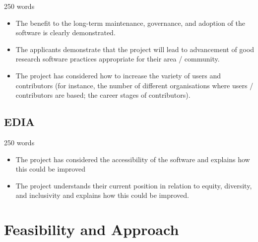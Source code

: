 \documentclass[12pt]{article}
\newenvironment{instruction}{%
    \begin{tcolorbox}[breakable,colback=red!5,colframe=red,title=Instruction]%
	}{%
    	\end{tcolorbox}%
	}
\begin{document}
\begin{instruction}

    250 words

    \begin{itemize}

        \item The benefit to the long-term maintenance, governance, and
            adoption of the software is clearly demonstrated.

        \item The applicants demonstrate that the project will lead to
            advancement of good research software practices appropriate for
            their area / community.

        \item The project has considered how to increase the variety of users
            and contributors (for instance, the number of different
            organisations where users / contributors are based; the career
            stages of contributors).

    \end{itemize}

\end{instruction}



\subsection{EDIA}

\begin{instruction}

    250 words

    \begin{itemize}

        \item The project has considered the accessibility of the software and
            explains how this could be improved

        \item The project understands their current position in relation to
            equity, diversity, and inclusivity and explains how this could be
            improved.

    \end{itemize}

\end{instruction}



\pagebreak

\section{Feasibility and Approach}
\end{document}
